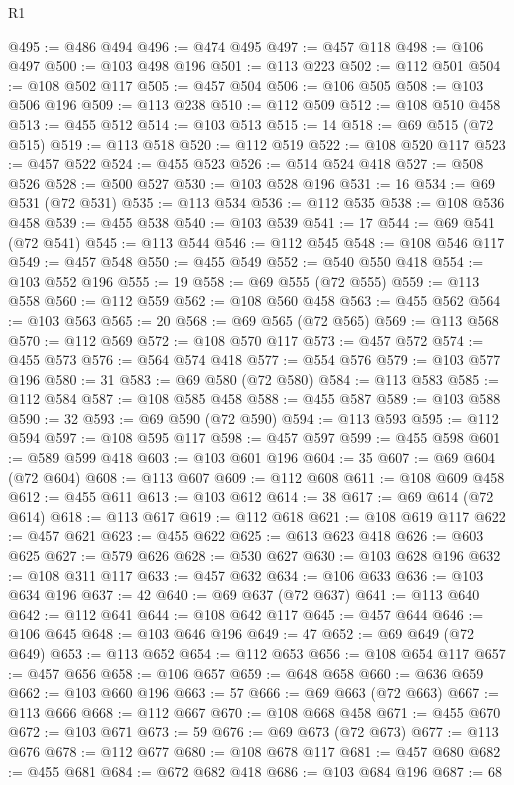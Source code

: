 \begin{lexlean}{R1}
\begin{coremodule}
@495 := @486 @494
@496 := @474 @495
@497 := @457 @118
@498 := @106 @497
@500 := @103 @498 @196
@501 := @113 @223
@502 := @112 @501
@504 := @108 @502 @117
@505 := @457 @504
@506 := @106 @505
@508 := @103 @506 @196
@509 := @113 @238
@510 := @112 @509
@512 := @108 @510 @458
@513 := @455 @512
@514 := @103 @513
@515 := 14
@518 := @69 @515 (@72 @515)
@519 := @113 @518
@520 := @112 @519
@522 := @108 @520 @117
@523 := @457 @522
@524 := @455 @523
@526 := @514 @524 @418
@527 := @508 @526
@528 := @500 @527
@530 := @103 @528 @196
@531 := 16
@534 := @69 @531 (@72 @531)
@535 := @113 @534
@536 := @112 @535
@538 := @108 @536 @458
@539 := @455 @538
@540 := @103 @539
@541 := 17
@544 := @69 @541 (@72 @541)
@545 := @113 @544
@546 := @112 @545
@548 := @108 @546 @117
@549 := @457 @548
@550 := @455 @549
@552 := @540 @550 @418
@554 := @103 @552 @196
@555 := 19
@558 := @69 @555 (@72 @555)
@559 := @113 @558
@560 := @112 @559
@562 := @108 @560 @458
@563 := @455 @562
@564 := @103 @563
@565 := 20
@568 := @69 @565 (@72 @565)
@569 := @113 @568
@570 := @112 @569
@572 := @108 @570 @117
@573 := @457 @572
@574 := @455 @573
@576 := @564 @574 @418
@577 := @554 @576
@579 := @103 @577 @196
@580 := 31
@583 := @69 @580 (@72 @580)
@584 := @113 @583
@585 := @112 @584
@587 := @108 @585 @458
@588 := @455 @587
@589 := @103 @588
@590 := 32
@593 := @69 @590 (@72 @590)
@594 := @113 @593
@595 := @112 @594
@597 := @108 @595 @117
@598 := @457 @597
@599 := @455 @598
@601 := @589 @599 @418
@603 := @103 @601 @196
@604 := 35
@607 := @69 @604 (@72 @604)
@608 := @113 @607
@609 := @112 @608
@611 := @108 @609 @458
@612 := @455 @611
@613 := @103 @612
@614 := 38
@617 := @69 @614 (@72 @614)
@618 := @113 @617
@619 := @112 @618
@621 := @108 @619 @117
@622 := @457 @621
@623 := @455 @622
@625 := @613 @623 @418
@626 := @603 @625
@627 := @579 @626
@628 := @530 @627
@630 := @103 @628 @196
@632 := @108 @311 @117
@633 := @457 @632
@634 := @106 @633
@636 := @103 @634 @196
@637 := 42
@640 := @69 @637 (@72 @637)
@641 := @113 @640
@642 := @112 @641
@644 := @108 @642 @117
@645 := @457 @644
@646 := @106 @645
@648 := @103 @646 @196
@649 := 47
@652 := @69 @649 (@72 @649)
@653 := @113 @652
@654 := @112 @653
@656 := @108 @654 @117
@657 := @457 @656
@658 := @106 @657
@659 := @648 @658
@660 := @636 @659
@662 := @103 @660 @196
@663 := 57
@666 := @69 @663 (@72 @663)
@667 := @113 @666
@668 := @112 @667
@670 := @108 @668 @458
@671 := @455 @670
@672 := @103 @671
@673 := 59
@676 := @69 @673 (@72 @673)
@677 := @113 @676
@678 := @112 @677
@680 := @108 @678 @117
@681 := @457 @680
@682 := @455 @681
@684 := @672 @682 @418
@686 := @103 @684 @196
@687 := 68

\end{coremodule}
\end{lexlean}
